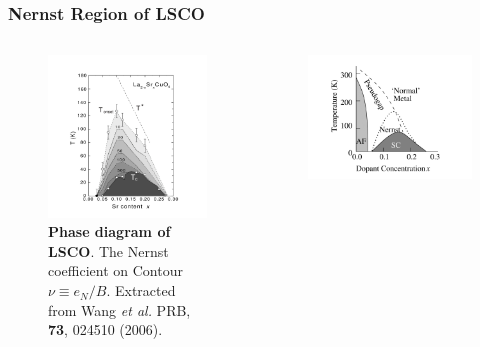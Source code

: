 \documentclass[10pt,aspectratio=43,xcolor=x11names,t]{beamer}%
\begin{document}
		\begin{frame}\frametitle{Nernst Region of LSCO}
			\begin{columns}
				\begin{column}{0.55\textwidth}
					\begin{figure}[!htp]
						\centering
						\includegraphics[scale=0.6]{LSCO.png}
						\caption{\textbf{Phase diagram of LSCO}. The Nernst coefficient on Contour $\nu\equiv e_N/B$. Extracted from {\scriptsize Wang \textit{et al.} PRB, \textbf{73}, 024510 (2006)}.}
					\end{figure}
				\end{column}
				\begin{column}{0.45\textwidth}
					\begin{figure}[!htp]
						\centering
						\includegraphics[scale=0.8]{Mott.png}

\end{figure}
\end{column}
\end{columns}
\end{frame}
\end{document}
